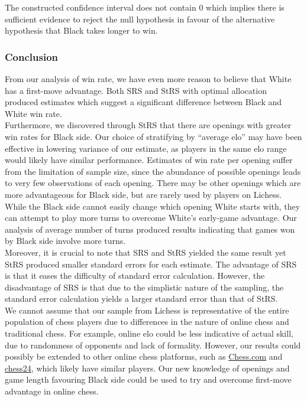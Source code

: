 \documentclass[11pt,]{article}
\begin{document}
The constructed confidence interval does not contain 0 which implies
there is sufficient evidence to reject the null hypothesis in favour of
the alternative hypothesis that Black takes longer to win.\\
\newline

\hypertarget{conclusion}{%
\subsubsection{\texorpdfstring{\textbf{Conclusion}}{Conclusion}}\label{conclusion}}

From our analysis of win rate, we have even more reason to believe that
White has a first-move advantage. Both SRS and StRS with optimal
allocation produced estimates which suggest a significant difference
between Black and White win rate.\\
\newline Furthermore, we discovered through StRS that there are openings
with greater win rates for Black side. Our choice of stratifying by
``average elo'' may have been effective in lowering variance of our
estimate, as players in the same elo range would likely have similar
performance. Estimates of win rate per opening suffer from the
limitation of sample size, since the abundance of possible openings
leads to very few observations of each opening. There may be other
openings which are more advantageous for Black side, but are rarely used
by players on Lichess.\\
\newline While the Black side cannot easily change which opening White
starts with, they can attempt to play more turns to overcome White's
early-game advantage. Our analysis of average number of turns produced
results indicating that games won by Black side involve more turns.\\
\newline Moreover, it is crucial to note that SRS and StRS yielded the
same result yet StRS produced smaller standard errors for each estimate.
The advantage of SRS is that it eases the difficulty of standard error
calculation. However, the disadvantage of SRS is that due to the
simplistic nature of the sampling, the standard error calculation yields
a larger standard error than that of StRS.\\
\newline We cannot assume that our sample from Lichess is representative
of the entire population of chess players due to differences in the
nature of online chess and traditional chess. For example, online elo
could be less indicative of actual skill, due to randomness of opponents
and lack of formality. However, our results could possibly be extended
to other online chess platforms, such as
\href{https://www.chess.com/}{Chess.com} and
\href{https://chess24.com/en}{chess24}, which likely have similar
players. Our new knowledge of openings and game length favouring Black
side could be used to try and overcome first-move advantage in online
chess. \newpage
\end{document}
